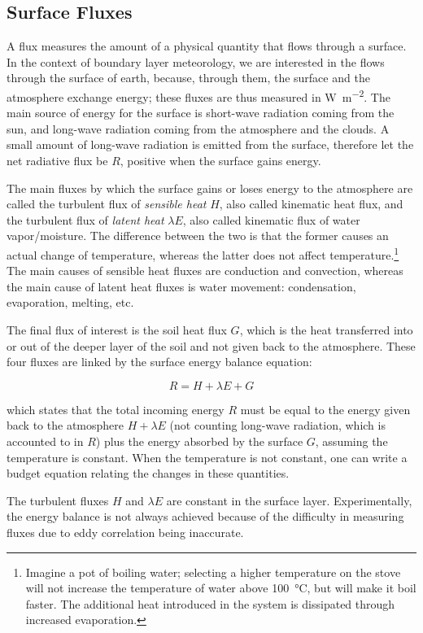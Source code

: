 \documentclass[a4paper,11pt]{kth-mag}
\begin{document}
\subsection{Surface Fluxes}
A flux measures the amount of a physical quantity that flows through a surface. In the context of boundary layer meteorology, we are interested in the flows through the surface of earth, because, through them, the surface and the atmosphere exchange energy; these fluxes are thus measured in \si{\watt\per\square\meter}. The main source of energy for the surface is short-wave radiation coming from the sun, and long-wave radiation coming from the atmosphere and the clouds. A small amount of long-wave radiation is emitted from the surface, therefore let the net radiative flux be $R$, positive when the surface gains energy.

The main fluxes by which the surface gains or loses energy to the atmosphere are called the turbulent flux of \emph{sensible heat} $H$, also called kinematic heat flux, and the turbulent flux of \emph{latent heat} $\lambda E$, also called kinematic flux of water vapor/moisture. The difference between the two is that the former causes an actual change of temperature, whereas the latter does not affect temperature.\footnote{Imagine a pot of boiling water; selecting a higher temperature on the stove will not increase the temperature of water above \SI{100}{\celsius}, but will make it boil faster. The additional heat introduced in the system is dissipated through increased evaporation.} The main causes of sensible heat fluxes are conduction and convection, whereas the main cause of latent heat fluxes is water movement: condensation, evaporation, melting, etc. 

The final flux of interest is the soil heat flux $G$, which is the heat transferred into or out of the deeper layer of the soil and not given back to the atmosphere. These four fluxes are linked by the surface energy balance equation:

$$
R=H+\lambda E+G
$$

\noindent which states that the total incoming energy $R$ must be equal to the energy given back to the atmosphere $H+\lambda E$ (not counting long-wave radiation, which is accounted to in $R$) plus the energy absorbed by the surface $G$, assuming the temperature is constant. When the temperature is not constant, one can write a budget equation relating the changes in these quantities.

The turbulent fluxes $H$ and $\lambda E$ are constant in the surface layer. Experimentally, the energy balance is not always achieved \citep{cabauwinsitu} because of the difficulty in measuring fluxes due to eddy correlation being inaccurate.
\end{document}
